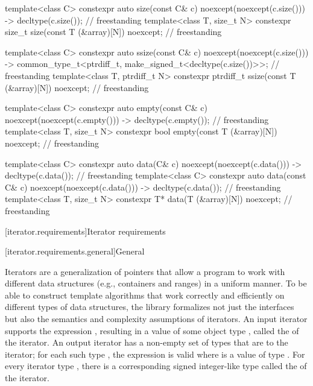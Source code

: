 \begin{codeblock}
{  template<class C> constexpr auto
    size(const C& c) noexcept(noexcept(c.size())) -> decltype(c.size());            // freestanding
  template<class T, size_t N> constexpr size_t
    size(const T (&array)[N]) noexcept;                                             // freestanding

  template<class C> constexpr auto
    ssize(const C& c) noexcept(noexcept(c.size()))
      -> common_type_t<ptrdiff_t, make_signed_t<decltype(c.size())>>;               // freestanding
  template<class T, ptrdiff_t N> constexpr ptrdiff_t
    ssize(const T (&array)[N]) noexcept;                                            // freestanding

  template<class C> constexpr auto
    empty(const C& c) noexcept(noexcept(c.empty())) -> decltype(c.empty());         // freestanding
  template<class T, size_t N> constexpr bool
    empty(const T (&array)[N]) noexcept;                                            // freestanding

  template<class C> constexpr auto
    data(C& c) noexcept(noexcept(c.data())) -> decltype(c.data());                  // freestanding
  template<class C> constexpr auto
    data(const C& c) noexcept(noexcept(c.data())) -> decltype(c.data());            // freestanding
  template<class T, size_t N> constexpr T* data(T (&array)[N]) noexcept;            // freestanding
}
\end{codeblock}

[iterator.requirements]{Iterator requirements}

[iterator.requirements.general]{General}

\pnum
{}%
Iterators are a generalization of pointers
that allow a \Cpp{} program to work with different data structures
(e.g., containers and ranges) in a uniform manner.
To be able to construct template algorithms that work correctly and
efficiently on different types of data structures,
the library formalizes not just the interfaces but also the
semantics and complexity assumptions of iterators.
An input iterator
supports the expression
,
resulting in a value of some object type
,
called the
of the iterator.
An output iterator  has a non-empty set of types that are
 to the iterator;
for each such type , the expression 
is valid where  is a value of type .
For every iterator type
,
there is a corresponding signed integer-like type called the
of the iterator.

